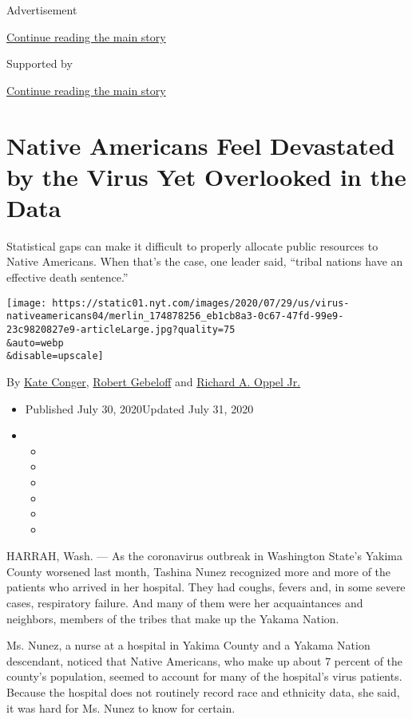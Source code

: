 Advertisement

\protect\hyperlink{after-top}{Continue reading the main story}

Supported by

\protect\hyperlink{after-sponsor}{Continue reading the main story}

\hypertarget{native-americans-feel-devastated-by-the-virus-yet-overlooked-in-the-data}{%
\section{Native Americans Feel Devastated by the Virus Yet Overlooked in
the
Data}\label{native-americans-feel-devastated-by-the-virus-yet-overlooked-in-the-data}}

Statistical gaps can make it difficult to properly allocate public
resources to Native Americans. When that's the case, one leader said,
``tribal nations have an effective death sentence.''

\texttt{[image: https://static01.nyt.com/images/2020/07/29/us/virus-nativeamericans04/merlin\_174878256\_eb1cb8a3-0c67-47fd-99e9-23c9820827e9-articleLarge.jpg?quality=75\\\&auto=webp\\\&disable=upscale]}

By \href{https://www.nytimes.com/by/kate-conger}{Kate Conger},
\href{https://www.nytimes.com/by/robert-gebeloff}{Robert Gebeloff} and
\href{https://www.nytimes.com/by/richard-a-oppel-jr}{Richard A. Oppel
Jr.}

\begin{itemize}
\item
  Published July 30, 2020Updated July 31, 2020
\item
  \begin{itemize}
  \item
  \item
  \item
  \item
  \item
  \item
  \end{itemize}
\end{itemize}

HARRAH, Wash. --- As the coronavirus outbreak in Washington State's
Yakima County worsened last month, Tashina Nunez recognized more and
more of the patients who arrived in her hospital. They had coughs,
fevers and, in some severe cases, respiratory failure. And many of them
were her acquaintances and neighbors, members of the tribes that make up
the Yakama Nation.

Ms. Nunez, a nurse at a hospital in Yakima County and a Yakama Nation
descendant, noticed that Native Americans, who make up about 7 percent
of the county's population, seemed to account for many of the hospital's
virus patients. Because the hospital does not routinely record race and
ethnicity data, she said, it was hard for Ms. Nunez to know for certain.

